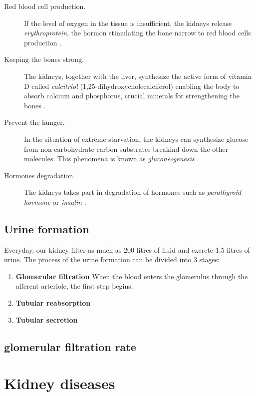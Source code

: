 \begin{description}
	\item [Red blood cell production.] If the level of oxygen in the tissue is insufficient, the kidneys release \textit{erythroprotein}, the hormon stimulating the bone narrow to red blood cells production \cite{donnelly2001erythropoietin}. 

\item [Keeping the bones strong.] The kidneys, together with the liver, synthesize the active form of vitamin D called \textit{calcitriol} (1,25-dihydroxycholecalciferol) enabling the body to absorb calcium and phosphorus, crucial minerals for strengthening the bones \cite{williams2009vitamin}.

\item [Prevent the hunger.] In the situation of extreme starvation, the kidneys can synthesize glucose from non-carbohydrate carbon substrates breakind down the other molecules. This phenomena is known as \textit{gluconeogenesis} \cite{newsholme1967control}.

\item [Hormones degradation.] The kidneys takes part in degradation of hormones such as \textit{parathyroid hormone} or \textit{insulin} \cite{emmanouel1980role}. 
%					
	\end{description} 

\subsection{Urine formation} 
Everyday, our kidney filter as much as 200 litres of fluid and excrete 1.5 litres of urine. The process of the urine formation can be divided into 3 stages:
\begin{enumerate}
\item{\textbf{Glomerular filtration}} When the blood enters the glomerulus through the afferent arteriole, the first step begins.  
\item{\textbf{Tubular reabsorption}}
\item{\textbf{Tubular secretion}}
\end{enumerate}


\subsection{glomerular filtration rate}

\section{Kidney diseases} 

 